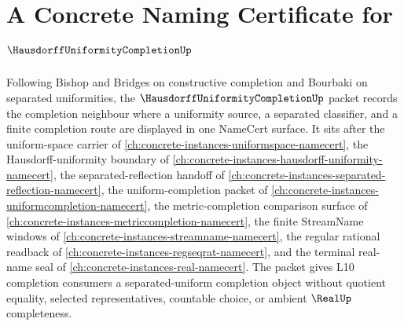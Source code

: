 \chapter{A Concrete Naming Certificate for $\HausdorffUniformityCompletionUp$}
\label{ch:concrete-instances-hausdorff-uniformity-completion-namecert}

Following Bishop and Bridges on constructive completion and Bourbaki on separated uniformities, the $\HausdorffUniformityCompletionUp$ packet records the completion neighbour where a uniformity source, a separated classifier, and a finite completion route are displayed in one NameCert surface. It sits after the uniform-space carrier of \autoref{ch:concrete-instances-uniformspace-namecert}, the Hausdorff-uniformity boundary of \autoref{ch:concrete-instances-hausdorff-uniformity-namecert}, the separated-reflection handoff of \autoref{ch:concrete-instances-separated-reflection-namecert}, the uniform-completion packet of \autoref{ch:concrete-instances-uniformcompletion-namecert}, the metric-completion comparison surface of \autoref{ch:concrete-instances-metriccompletion-namecert}, the finite StreamName windows of \autoref{ch:concrete-instances-streamname-namecert}, the regular rational readback of \autoref{ch:concrete-instances-regseqrat-namecert}, and the terminal real-name seal of \autoref{ch:concrete-instances-real-namecert}. The packet gives L10 completion consumers a separated-uniform completion object without quotient equality, selected representatives, countable choice, or ambient $\RealUp$ completeness.

